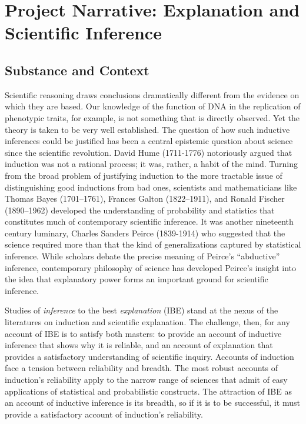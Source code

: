 \documentclass{article}[11pt]
\begin{document}
\section{Project Narrative: Explanation and Scientific Inference}

\subsection{Substance and Context}

Scientific reasoning draws conclusions dramatically different from the evidence on which they are based.  Our knowledge of the function of DNA in the replication of phenotypic traits, for example, is not something that is directly observed.  Yet the theory is taken to be very well established.  The question of how such inductive inferences could be justified has been a central epistemic question about science since the scientific revolution.   David Hume (1711-1776) notoriously argued that induction was not a rational process; it was, rather, a habit of the mind.  Turning from the broad problem of justifying induction to the more tractable issue of distinguishing good inductions from bad ones, scientists and mathematicians like Thomas Bayes (1701--1761), Frances Galton (1822--1911), and Ronald Fischer (1890--1962) developed the understanding of probability and statistics that constitutes much of contemporary scientific inference.  It was another nineteenth century luminary, Charles Sanders Peirce (1839-1914) who suggested that the science required more than that the kind of generalizations captured by statistical inference.  While scholars debate the precise meaning of Peirce's ``abductive'' inference, contemporary philosophy  of science has developed Peirce's insight into the idea that explanatory power forms an important ground for scientific inference.

Studies of \textit{inference} to the best \textit{explanation} (IBE) stand at the nexus of the literatures on induction and scientific explanation.  The challenge, then, for any account of IBE is to satisfy both masters: to provide an account of inductive inference that shows why it is reliable, and an account of explanation that provides a satisfactory understanding of scientific inquiry.  Accounts of induction face a tension between reliability and breadth.  The most robust accounts of induction's reliability apply to the narrow range of sciences that admit of easy applications of statistical and probabilistic constructs.  The attraction of IBE as an account of inductive inference is its breadth, so if it is to be successful, it must provide a satisfactory account of induction's reliability. 
\end{document}
